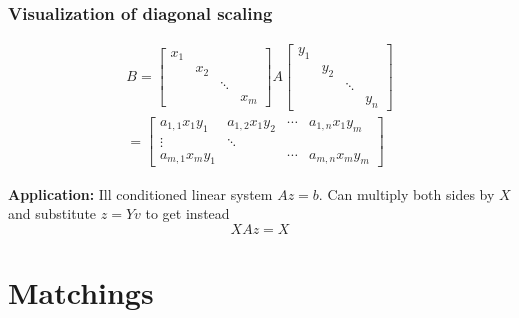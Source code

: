 \documentclass{beamer}
\begin{document}
\begin{frame}
  \frametitle{Visualization of diagonal scaling}

  \begin{equation}
    \begin{aligned}
    B = \begin{bmatrix}
      x_1 & & & \\
      & x_2 & & \\
      & & \ddots & \\
      & & & x_m
    \end{bmatrix}
    A
    \begin{bmatrix}
      y_1 & & & \\
      & y_2 & & \\
      & & \ddots & \\
      & & & y_n
    \end{bmatrix}
    \\
    =
    \begin{bmatrix}
      a_{1,1}x_1y_1 & a_{1,2}x_1y_2 & \cdots & a_{1,n} x_1y_m \\
      \vdots   & \ddots & & \\
      a_{m,1}x_m y_1 & & \cdots & a_{m,n}x_m y_m
    \end{bmatrix}
    \end{aligned}
  \end{equation}
  \begin{block}{\textbf{Application:} Ill conditioned linear system $Az = b$.}
    Can multiply both sides by $X$  and substitute $z= Yv$ to get instead
    \begin{equation}
      XAz = X
    \end{equation}
  \end{block}
\end{frame}

\section{Matchings}%
\label{sec:}
\end{document}
